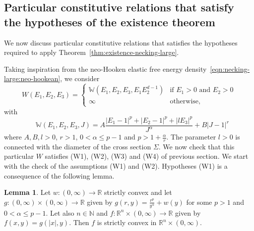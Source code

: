 \documentclass[a4paper,10pt,twoside]{amsbook}
\numberwithin{section}{chapter}
\numberwithin{equation}{chapter}
\theoremstyle{definition}
\newtheorem{lemma}[prop]{Lemma}
\begin{document}
\subsection{Particular constitutive relations that satisfy the hypotheses of the existence theorem}

\label{subsec:constitutive-large-neck}

We now discuss particular constitutive relations that satisfies the hypotheses required to apply Theorem~\ref{thm:existence-necking-large}.

Taking inspiration from the neo-Hooken elastic free energy density~\eqref{eqn:necking-large:neo-hookean}, we consider
\[
W(E_1,E_2,E_3)=
\begin{cases}
\mathbb{W}(E_1,E_2,E_3,E_1E_2^{d-1}) & \text{if $E_1>0$ and $E_2>0$} \\
\infty & \text{otherwise},
\end{cases}
\]
with
\[
\quad \mathbb{W}(E_1,E_2,E_3,J)=A\frac{|E_1-1|^p+|E_2-1|^p+|lE_3|^p}{J^\alpha}+B|J-1|^r
\]
where $A,B,l>0$, $r>1$, $0<\alpha\le p-1$ and $p>1+\frac{\alpha}{r}$. The parameter $l>0$ is connected with the diameter of the cross section $\Sigma$. We now check that this particular $W$ satisfies (W1), (W2), (W3) and (W4) of previous section. We start with the check of the assumptions (W1) and (W2). Hypotheses (W1) is a consequence of the following lemma.
\begin{lemma}
Let $w\colon(0,\infty)\to\mathbb{R}$ strictly convex and let $g\colon(0,\infty)\times(0,\infty)\to\mathbb{R}$ given by $g(r,y)=\frac{r^p}{y^\alpha}+w(y)$ for some $p>1$ and $0<\alpha\le p-1$. Let also $n\in\mathbb{N}$ and $f\colon\mathbb{R}^n\times(0,\infty)\to\mathbb{R}$ given by $f(x,y)=g(|x|,y)$. Then $f$ is strictly convex in $\mathbb{R}^n\times(0,\infty)$.
\end{lemma}
\end{document}
